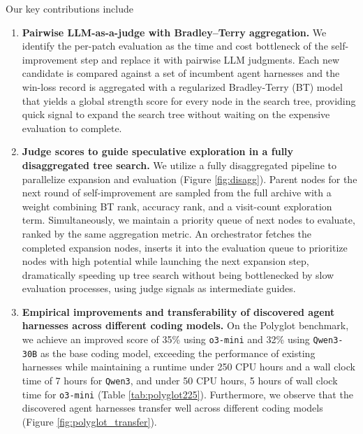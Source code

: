 \documentclass{article}
\begin{document}
Our key contributions include
\begin{enumerate}
    \item \textbf{Pairwise LLM-as-a-judge with Bradley--Terry aggregation.} We identify the per-patch evaluation as the time and cost bottleneck of the self-improvement step and replace it with pairwise LLM judgments. Each new candidate is compared against a set of incumbent agent harnesses and the win-loss record is aggregated with a regularized Bradley-Terry (BT) model that yields a global strength score for every node in the search tree, providing quick signal to expand the search tree without waiting on the expensive evaluation to complete.
    \item \textbf{Judge scores to guide speculative exploration in a fully disaggregated tree search.} We utilize a fully disaggregated pipeline to parallelize expansion and evaluation (Figure \ref{fig:disagg}). Parent nodes for the next round of self-improvement are sampled from the full archive with a weight combining BT rank, accuracy rank, and a visit-count exploration term. Simultaneously, we maintain a priority queue of next nodes to evaluate, ranked by the same aggregation metric. An orchestrator fetches the completed expansion nodes, inserts it into the evaluation queue to prioritize nodes with high potential while launching the next expansion step, dramatically speeding up tree search without being bottlenecked by slow evaluation processes, using judge signals as intermediate guides.
    \item \textbf{Empirical improvements and transferability of discovered agent harnesses across different coding models.} On the Polyglot benchmark, we achieve an improved score of 35\% using \texttt{o3-mini} and 32\% using \texttt{Qwen3-30B} as the base coding model, exceeding the performance of existing harnesses while maintaining a runtime under 250 CPU hours and a wall clock time of 7 hours for \texttt{Qwen3}, and under 50 CPU hours, 5 hours of wall clock time for \texttt{o3-mini} (Table \ref{tab:polyglot225}). Furthermore, we observe that the discovered agent harnesses transfer well across different coding models (Figure \ref{fig:polyglot_transfer}).
\end{enumerate}
\end{document}
